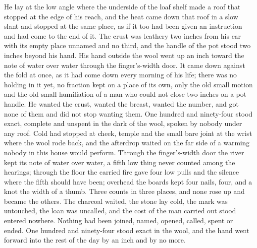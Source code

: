 He lay at the low angle where the underside of the loaf shelf made a roof that stopped at the edge of his reach, and the heat came down that roof in a slow slant and stopped at the same place, as if it too had been given an instruction and had come to the end of it. The crust was leathery two inches from his ear with its empty place unnamed and no third, and the handle of the pot stood two inches beyond his hand. His hand outside the wool went up an inch toward the note of water over water through the finger's-width door. It came down against the fold at once, as it had come down every morning of his life; there was no holding in it yet, no fraction kept on a place of its own, only the old small motion and the old small humiliation of a man who could not close two inches on a pot handle. He wanted the crust, wanted the breast, wanted the number, and got none of them and did not stop wanting them. One hundred and ninety-four stood exact, complete and unspent in the dark of the wool, spoken by nobody under any roof. Cold had stopped at cheek, temple and the small bare joint at the wrist where the wool rode back, and the afterdrop waited on the far side of a warming nobody in this house would perform. Through the finger's-width door the river kept its note of water over water, a fifth low thing never counted among the hearings; through the floor the carried fire gave four low pulls and the silence where the fifth should have been; overhead the boards kept four nails, four, and a knot the width of a thumb. Three counts in three places, and none rose up and became the others. The charcoal waited, the stone lay cold, the mark was untouched, the loan was uncalled, and the cost of the man carried out stood entered nowhere. Nothing had been joined, named, opened, called, spent or ended. One hundred and ninety-four stood exact in the wool, and the hand went forward into the rest of the day by an inch and by no more.

